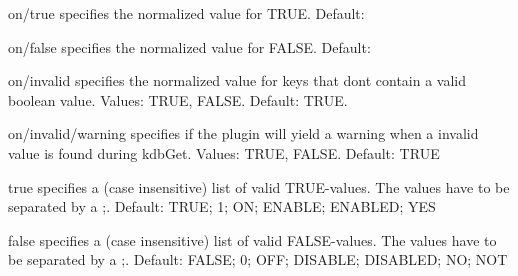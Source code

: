 \begin{DoxyItemize}
\item {\ttfamily on/true} specifies the normalized value for {\ttfamily T\+R\+UE}. Default\+: {}
\item {\ttfamily on/false} specifies the normalized value for {\ttfamily F\+A\+L\+SE}. Default\+: {}
\item {\ttfamily on/invalid} specifies the normalized value for keys that don\textquotesingle{}t contain a valid boolean value. Values\+: {\ttfamily T\+R\+UE}, {\ttfamily F\+A\+L\+SE}. Default\+: {\ttfamily T\+R\+UE}.
\item {\ttfamily on/invalid/warning} specifies if the plugin will yield a warning when a invalid value is found during kdb\+Get. Values\+: {\ttfamily T\+R\+UE}, {\ttfamily F\+A\+L\+SE}. Default\+: {\ttfamily T\+R\+UE}
\item {\ttfamily true} specifies a (case insensitive) list of valid {\ttfamily T\+R\+UE}-\/values. The values have to be separated by a {\ttfamily ;}. Default\+: {\ttfamily T\+R\+UE; 1; ON; E\+N\+A\+B\+LE; E\+N\+A\+B\+L\+ED; Y\+ES}
\item {\ttfamily false} specifies a (case insensitive) list of valid {\ttfamily F\+A\+L\+SE}-\/values. The values have to be separated by a {\ttfamily ;}. Default\+: {\ttfamily F\+A\+L\+SE; 0; O\+FF; D\+I\+S\+A\+B\+LE; D\+I\+S\+A\+B\+L\+ED; NO; N\+OT} 
\end{DoxyItemize}